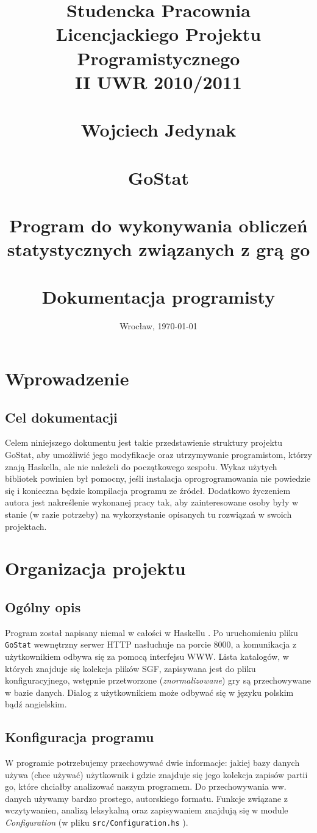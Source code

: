 \documentclass[10pt,leqno]{article}
\title{\normalsize \textbf{Studencka Pracownia Licencjackiego Projektu Programistycznego} \\
       \textbf{II UWR 2010/2011} \\ 
       \ \\
       \vspace{15em}
       \Large Wojciech Jedynak \\
       \normalsize \ \\
       \Huge GoStat \\
       \tiny \ \\
       \LARGE \textbf{Program do wykonywania obliczeń} \\
              \textbf{statystycznych związanych z grą go} \\ 
       \ \\
       \Large Dokumentacja programisty \\
       \vspace{15em}
       }
\date{Wrocław, \today}
\newcommand{\cmd}[1]{
  \texttt{#1}
}
\begin{document}
\maketitle 
\thispagestyle{empty}

\newpage

\tableofcontents

\newpage

\section{Wprowadzenie}

\subsection{Cel dokumentacji}
Celem niniejszego dokumentu jest takie przedstawienie struktury projektu GoStat, aby umożliwić jego modyfikacje oraz utrzymywanie programistom, którzy
znają Haskella, ale nie należeli do początkowego zespołu. Wykaz użytych bibliotek powinien był pomocny, jeśli instalacja oprogrogramowania nie powiedzie 
się i konieczna będzie kompilacja programu ze źródeł. Dodatkowo życzeniem autora jest nakreślenie wykonanej pracy tak, aby zainteresowane osoby
były w stanie (w razie potrzeby) na wykorzystanie opisanych tu rozwiązań w swoich projektach.

\section{Organizacja projektu}

\subsection{Ogólny opis}
Program został napisany niemal w całości w Haskellu \cite{haskell}. 
Po uruchomieniu pliku \cmd{GoStat} wewnętrzny serwer HTTP nasłuchuje na porcie 8000, 
a komunikacja z użytkownikiem odbywa się za pomocą interfejsu WWW. 
Lista katalogów, w których znajduje się kolekcja plików SGF, zapisywana jest do pliku konfiguracyjnego,
wstępnie przetworzone (\emph{znormalizowane}) gry są przechowywane w bazie danych. Dialog z użytkownikiem może odbywać się w języku
polskim bądź angielskim.

\subsection{Konfiguracja programu}

W programie potrzebujemy przechowywać dwie informacje: jakiej bazy danych używa (chce używać) użytkownik i gdzie znajduje się jego
kolekcja zapisów partii go, które chciałby analizować naszym programem. Do przechowywania ww. danych używamy bardzo prostego, 
autorskiego formatu. Funkcje związane z wczytywanien, analizą leksykalną oraz zapisywaniem znajdują się w module \emph{Configuration}
(w pliku \cmd{src/Configuration.hs}).
\end{document}
